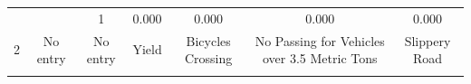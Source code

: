\documentclass[11pt]{article}
\begin{document}
\begin{longtable}[]{@{}ccccccc@{}}
\begin{minipage}[t]{0.04\columnwidth}
\strut
\end{minipage} & \begin{minipage}[t]{0.04\columnwidth}\centering\strut
\strut
\end{minipage} & \begin{minipage}[t]{0.04\columnwidth}\centering\strut
1\strut
\end{minipage} & \begin{minipage}[t]{0.04\columnwidth}\centering\strut
0.000\strut
\end{minipage} & \begin{minipage}[t]{0.04\columnwidth}\centering\strut
0.000\strut
\end{minipage} & \begin{minipage}[t]{0.04\columnwidth}\centering\strut
0.000\strut
\end{minipage} & \begin{minipage}[t]{0.04\columnwidth}\centering\strut
0.000\strut
\end{minipage}\tabularnewline
\begin{minipage}[t]{0.04\columnwidth}\centering\strut
2\strut
\end{minipage} & \begin{minipage}[t]{0.04\columnwidth}\centering\strut
No entry\strut
\end{minipage} & \begin{minipage}[t]{0.04\columnwidth}\centering\strut
No entry\strut
\end{minipage} & \begin{minipage}[t]{0.04\columnwidth}\centering\strut
Yield\strut
\end{minipage} & \begin{minipage}[t]{0.04\columnwidth}\centering\strut
Bicycles Crossing\strut
\end{minipage} & \begin{minipage}[t]{0.04\columnwidth}\centering\strut
No Passing for Vehicles over 3.5 Metric Tons\strut
\end{minipage} & \begin{minipage}[t]{0.04\columnwidth}\centering\strut
Slippery Road\strut
\end{minipage}\tabularnewline
\begin{minipage}[t]{0.04\columnwidth}\centering\strut
\strut
\end{minipage} & \begin{minipage}[t]{0.04\columnwidth}\centering\strut
\strut
\end{minipage} & \begin{minipage}[t]{0.04\columnwidth}\centering\strut

\end{minipage}
\end{longtable}
\end{document}
